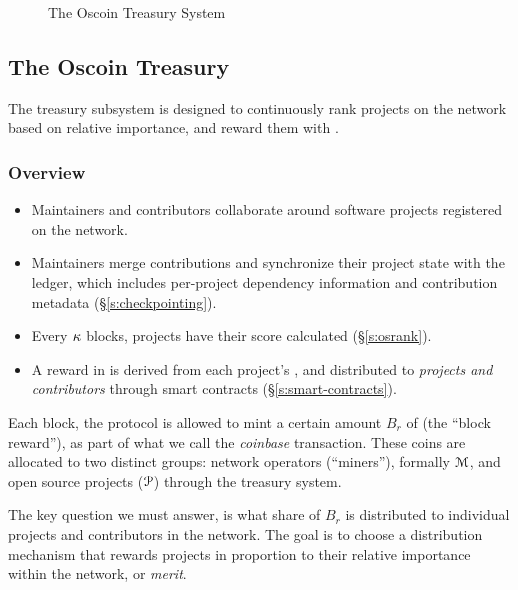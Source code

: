 \begin{figure*}[!ht]
    \par\medskip\noindent\minipage{\linewidth}
    \centering
    
    \caption{The Oscoin Treasury System\label{f:oscoin}}
    \endminipage\par\medskip
\end{figure*}

\subsection{The Oscoin Treasury}
\label{s:treasury}

The treasury subsystem is designed to continuously rank projects on the
network based on relative importance, and reward them with \oscoin{}.

\subsubsection{Overview}

\begin{itemize}
    \item Maintainers and contributors collaborate around software projects
        registered on the network.
    \item Maintainers merge contributions and synchronize their project state
        with the ledger, which includes per-project dependency information and
        contribution metadata (\S\ref{s:checkpointing}).
    \item Every $\kappa$ blocks, projects have their \osrank{} score calculated
        (\S\ref{s:osrank}).
    \item A reward in \oscoin{} is derived from each project's \osrank{},
        and distributed to \emph{projects and contributors} through smart
        contracts (\S\ref{s:smart-contracts}).
\end{itemize}

\medskip

\noindent Each block, the protocol is allowed to mint a certain amount $B_r$ of \oscoin{}
(the ``block reward''), as part of what we call the \emph{coinbase}
transaction. These coins are allocated to two distinct groups: network
operators (``miners''), formally $\mathcal{M}$, and open source projects ($\mathcal{P}$)
through the treasury system.

The key question we must answer, is what share of $B_r$ is distributed to
individual projects and contributors in the network.  The goal is to choose
a distribution mechanism that rewards projects in proportion to their relative
importance within the network, or \emph{merit}.


